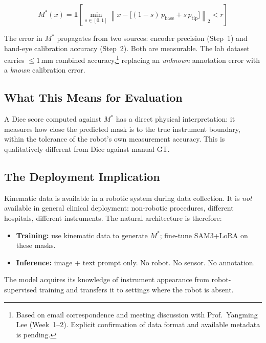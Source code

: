 \documentclass[11pt, a4paper]{article}
\begin{document}
\begin{equation}
    M^*(x) = \mathbf{1}\!\left[
        \min_{s\in[0,1]} \left\| x -
        \bigl[(1{-}s)\,p_{\text{base}} + s\,p_{\text{tip}}\bigr]
        \right\|_2 < r
    \right]
\end{equation}

The error in $M^*$ propagates from two sources: encoder precision
(Step~1) and hand-eye calibration accuracy (Step~2). Both are
measurable. The lab dataset carries $\leq 1$\,mm combined accuracy,\footnote{Based
on email correspondence and meeting discussion with Prof.\ Yangming Lee
(Week~1--2). Explicit confirmation of data format and available metadata
is pending.} replacing an \textit{unknown} annotation error with a
\textit{known} calibration error.

\subsection{What This Means for Evaluation}

A Dice score computed against $M^*$ has a direct physical interpretation:
it measures how close the predicted mask is to the true instrument boundary,
within the tolerance of the robot's own measurement accuracy.
This is qualitatively different from Dice against manual GT.

\subsection{The Deployment Implication}

Kinematic data is available in a robotic system during data collection.
It is \textit{not} available in general clinical deployment: non-robotic
procedures, different hospitals, different instruments.
The natural architecture is therefore:

\begin{itemize}[noitemsep]
    \item \textbf{Training:} use kinematic data to generate $M^*$;
          fine-tune SAM3+LoRA on these masks.
    \item \textbf{Inference:} image + text prompt only. No robot.
          No sensor. No annotation.
\end{itemize}

The model acquires its knowledge of instrument appearance from robot-supervised
training and transfers it to settings where the robot is absent.

\end{document}
